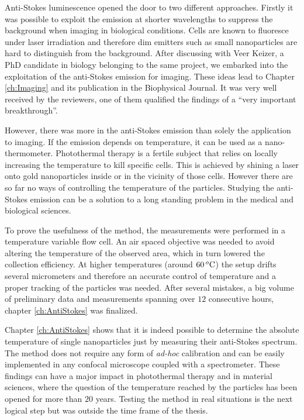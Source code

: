 Anti-Stokes luminescence opened the door to two different approaches. Firstly it
was possible to exploit the emission at shorter wavelengths to suppress the
background when imaging in biological conditions. Cells are known to fluoresce
under laser irradiation and therefore dim emitters such as small nanoparticles
are hard to distinguish from the background. After discussing with Veer Keizer,
a PhD candidate in biology belonging to the same project, we embarked into the
exploitation of the anti-Stokes emission for imaging. These ideas lead to
Chapter \ref{ch:Imaging} and its publication in the Biophysical Journal. It was
very well received by the reviewers, one of them qualified the findings of
a ``very important breakthrough''.

However, there was more in the anti-Stokes emission than solely the application
to imaging. If the emission depends on temperature, it can be used as a
nano-thermometer. Photothermal therapy is a fertile subject that relies on
locally increasing the temperature to kill specific cells. This is achieved by
shining a laser onto gold nanoparticles inside or in the vicinity of those
cells. However there are so far no ways of controlling the temperature of the
particles. Studying the anti-Stokes emission can be a solution to a long
standing problem in the medical and biological sciences.

To prove the usefulness of the method, the measurements were performed in a
temperature variable flow cell. An air spaced objective was needed to avoid
altering the temperature of the observed area, which in turn lowered the
collection efficiency. At higher temperatures (around $60\,^o\textrm{C}$) the setup
drifts several micrometers and therefore an accurate control of temperature and
a proper tracking of the particles was needed. After several mistakes, a big
volume of preliminary data and measurements spanning over $12$ consecutive
hours, chapter \ref{ch:AntiStokes} was finalized. 

Chapter \ref{ch:AntiStokes} shows that it is indeed possible to determine the
absolute temperature of single nanoparticles just by measuring their anti-Stokes
spectrum. The method does not require any form of \textit{ad-hoc} calibration
and can be easily implemented in any confocal microscope coupled with a
spectrometer. These findings can have a major impact in photothermal therapy and
in material sciences, where the question of the temperature reached by the
particles has been opened for more than $20$ years. Testing the method in real
situations is the next logical step but was outside the time frame of the
thesis.

